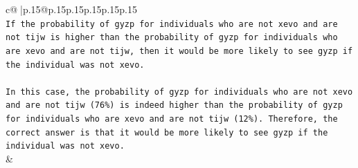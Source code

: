 \documentclass{article}
\begin{document}
{\begin{supertabular}{c@{$\;$}|p{.15\linewidth}@{}p{.15\linewidth}p{.15\linewidth}p{.15\linewidth}p{.15\linewidth}p{.15\linewidth}}
{{{\\ 
\texttt{If the probability of gyzp for individuals who are not xevo and are not tijw is higher than the probability of gyzp for individuals who are xevo and are not tijw, then it would be more likely to see gyzp if the individual was not xevo. } \\
\\ 
\texttt{In this case, the probability of gyzp for individuals who are not xevo and are not tijw (76\%) is indeed higher than the probability of gyzp for individuals who are xevo and are not tijw (12\%). Therefore, the correct answer is that it would be more likely to see gyzp if the individual was not xevo.} \\
            }
        }
    }
    & \\ \\

\end{supertabular}
}
\end{document}
